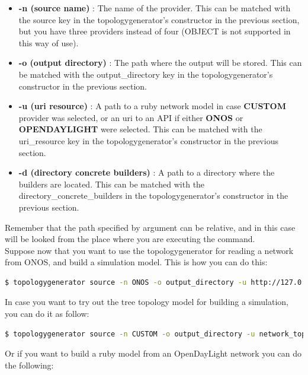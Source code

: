 \begin{itemize}
\item \textbf{-n (source name)} : The name of the provider. This can be matched with the source key in the topologygenerator's constructor in the previous section, but you have three providers instead of four (OBJECT is not supported in this way of use).
\item \textbf{-o (output directory)} : The path where the output will be stored. This can be matched with the output\_directory key in the topologygenerator's constructor in the previous section.
\item \textbf{-u (uri resource)} : A path to a ruby network model in case \textbf{CUSTOM} provider was selected, or an uri to an API if either \textbf{ONOS} or \textbf{OPENDAYLIGHT} were selected. This can be matched with the uri\_resource key in the topologygenerator's constructor in the previous section.
\item \textbf{-d (directory concrete builders)} : A path to a directory where the builders are located. This can be matched with the directory\_concrete\_builders in the topologygenerator's constructor in the previous section.
\end{itemize}

Remember that the path specified by argument can be relative, and in this case will be looked from the place where you are executing the command.\\

Suppose now that you want to use the topologygenerator for reading a network from ONOS, and build a simulation model. This is how you can do this:

\begin{lstlisting}[language=bash,breaklines=true]
$ topologygenerator source -n ONOS -o output_directory -u http://127.0.0.1/onos/v1/ -d builders_examples/pdm_builders
\end{lstlisting}

In case you want to try out the tree topology model for building a simulation, you can do it as follow:

\begin{lstlisting}[language=bash,breaklines=true]
$ topologygenerator source -n CUSTOM -o output_directory -u network_topologies_examples/tree_topology.rb -d builders_examples/pdm_builders
\end{lstlisting}

Or if you want to build a ruby model from an OpenDayLight network you can do the following:

